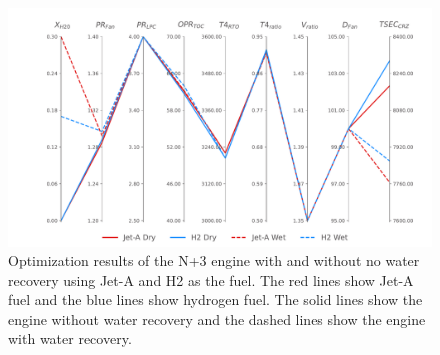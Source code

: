 \documentclass[conf]{new-aiaa}
\begin{document}
\begin{figure}[hbt!]
    \centering
    \includegraphics[width=1.0\textwidth]{N3_parallel_coords.pdf}
    \caption{
        Optimization results of the N+3 engine with and without no water recovery using Jet-A and H2 as the fuel.
        The red lines show Jet-A fuel and the blue lines show hydrogen fuel.
        The solid lines show the engine without water recovery and the dashed lines show the engine with water recovery.
    }
    \label{fig:parallel_coords}
\end{figure}
\end{document}
